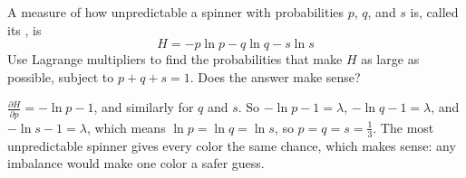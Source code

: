 \begin{Exercise}[title={The Most Uncertain Spinner}, label=lm_entropy]
A measure of how unpredictable a spinner with probabilities $p$, $q$, and $s$ is, called
its , is
$$H = -p\ln p - q\ln q - s\ln s$$
Use Lagrange multipliers to find the probabilities that make $H$ as large as possible,
subject to $p + q + s = 1$. Does the answer make sense?
\end{Exercise}
\begin{Answer}[ref=lm_entropy]
$\frac{\partial H}{\partial p} = -\ln p - 1$, and similarly for $q$ and $s$. So
$-\ln p - 1 = \lambda$, $-\ln q - 1 = \lambda$, and $-\ln s - 1 = \lambda$, which means
$\ln p = \ln q = \ln s$, so $p = q = s = \frac{1}{3}$. The most unpredictable spinner gives
every color the same chance, which makes sense: any imbalance would make one color a
safer guess.
\end{Answer}
